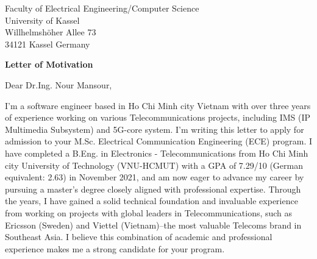 \documentclass[a4paper,12pt]{letter}
\date{}
\begin{document}
\begin{letter}{
    Faculty of Electrical Engineering/Computer Science
    \\ University of Kassel
    \\ Willhelmshöher Allee 73
    \\ 34121 Kassel Germany
}

\vspace*{-1.5cm}
\begin{center}
    \LARGE \textbf{Letter of Motivation}
\end{center}

\vspace{0.2cm} %

\opening{Dear Dr.Ing. Nour Mansour,}

I'm a software engineer based in Ho Chi Minh city Vietnam with over three years of experience working on various Telecommunications projects, including IMS (IP Multimedia Subsystem) and 5G-core system. I'm writing this letter to apply for admission to your M.Sc. Electrical Communication Engineering (ECE) program. I have completed a B.Eng. in Electronics - Telecommunications from Ho Chi Minh city University of Technology (VNU-HCMUT) with a GPA of 7.29/10 (German equivalent: 2.63) in November 2021, and am now eager to advance my career by pursuing a master's degree closely aligned with professional expertise. 
Through the years, I have gained a solid technical foundation and invaluable experience from working on projects with global leaders in Telecommunications, such as Ericsson (Sweden) and Viettel (Vietnam)--the most valuable Telecoms brand in Southeast Asia. I believe this combination of academic and professional experience makes me a strong candidate for your program.

% 


\end{letter}
\end{document}
